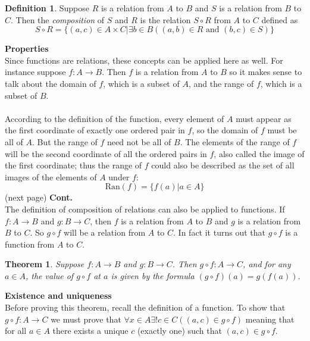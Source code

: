 \documentclass{report}
\newtheorem*{theorem}{Theorem}
\theoremstyle{definition}
\newtheorem*{definition}{Definition}
\begin{document}
\begin{definition}
Suppose $R$ is a relation from $A$ to $B$ and $S$ is a relation from $B$ to $C$. Then the \textit{composition} of $S$ and $R$ is the relation $S\circ R$ from $A$ to $C$ defined as
\begin{equation*}
S\circ R=\{(a,c)\in A\times C|\exists b\in B((a,b)\in R\text{ and }(b,c)\in S)\}
\end{equation*}
\end{definition}
\noindent\textbf{Properties}\\
Since functions are relations, these concepts can be applied here as well. For instance suppose $f:A\to B$. Then $f$ is a relation from $A$ to $B$ so it makes sense to talk about the 
domain of $f$, which is a subset of $A$, and the range of $f$, which is a subset of $B$.\\
\vspace{1mm}\\
According to the definition of the function, every element of $A$ must appear as the first coordinate of exactly one ordered pair in $f$, so the domain of $f$ must be all of $A$. But the range
of $f$ need not be all of $B$. The elements of the range of $f$ will be the second coordinate 
of all the ordered pairs in $f$, also called the image of the first coordinate; thus the range of $f$ could also be described as the set of all images of the elements of $A$ under $f$:
\begin{equation*}
\text{Ran}(f)=\{f(a)|a\in A\}
\end{equation*}
(next page)\newpage
\noindent\textbf{Cont.}\\
The definition of composition of relations can also be applied to functions. If $f:A\to B$ and $g:B\to C$, then $f$ is a relation from $A$ to $B$ and $g$ is a relation from $B$ to $C$. So $g\circ f$
will be a relation from $A$ to $C$. In fact it turns out that $g\circ f$ is a function from $A$ to $C$.
\begin{theorem}
Suppose $f:A\to B$ and $g:B\to C$. Then $g\circ f:A\to C$, and for any $a\in A$, the value of $g\circ f$ at $a$ is given by the formula $(g\circ f)(a)=g(f(a))$.
\end{theorem}
\noindent\textbf{Existence and uniqueness}\\
Before proving this theorem, recall the definition of a function. To show that $g\circ f:A\to C$ we must prove that $\forall x\in A\exists!c\in C((a,c)\in g\circ f)$ meaning
that for all $a\in A$ there exists a unique $c$ (exactly one) such that $(a,c)\in g\circ f$.\\
\end{document}
